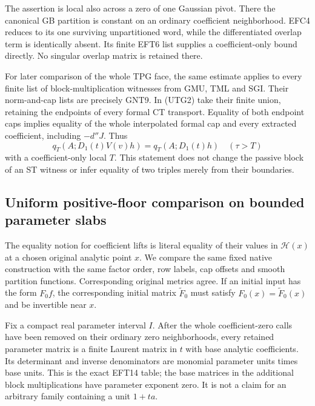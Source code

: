 The assertion is local also across a zero of one Gaussian pivot.
There the canonical GB partition is constant on an ordinary
coefficient neighborhood.  EFC4 reduces to its one surviving
unpartitioned word, while the differentiated overlap term is
identically absent.  Its finite EFT6 list supplies a coefficient-only
bound directly.  No singular overlap matrix is retained there.

For later comparison of the whole TPG face, the same estimate
applies to every finite list of block-multiplication witnesses
from GMU, TML and SGI.  Their norm-and-cap lists are precisely
GNT9.  In (UTG2) take their finite union, retaining the endpoints
of every formal CT transport.  Equality of both endpoint caps
implies equality of the whole interpolated formal cap and every
extracted coefficient, including $-d''J$.  Thus
\[
 q_T(A;D_1(t)V(v)h)=q_T(A;D_1(t)h)
 \quad(\tau>T)
 \tag{UTG9}
\]
with a coefficient-only local $T$.  This statement does not
change the passive block of an ST witness or infer equality
of two triples merely from their boundaries.

\subsection{Uniform positive-floor comparison on bounded parameter slabs}

The equality notion for coefficient lifts is literal equality
of their values in $\mathscr H(x)$ at a chosen original analytic
point $x$.  We compare the same fixed native construction with
the same factor order, row labels, cap offsets and smooth
partition functions.  Corresponding original metrics agree.
If an initial input has the form $F_0f$, the corresponding
initial matrix $\widetilde F_0$ must satisfy
$F_0(x)=\widetilde F_0(x)$ and be invertible near $x$.

Fix a compact real parameter interval $I$.  After the whole
coefficient-zero calls have been removed on their ordinary
zero neighborhoods, every retained parameter matrix is a
finite Laurent matrix in $t$ with base analytic coefficients.
Its determinant and inverse denominators are monomial parameter
units times base units.  This is the exact EFT14 table; the
base matrices in the additional block multiplications have
parameter exponent zero.  It is not a claim for an arbitrary
family containing a unit $1+ta$.

